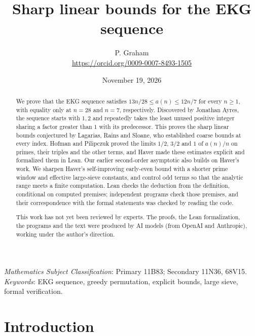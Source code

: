 \documentclass[11pt]{article}
\title{Sharp linear bounds for the EKG sequence}
\author{P. Graham\\ \small\url{https://orcid.org/0009-0007-8493-1505}}
\date{November 19, 2026}
\theoremstyle{definition}
\theoremstyle{remark}
\begin{document}
\maketitle

\begin{abstract}
We prove that the EKG sequence satisfies $13n/28\le a(n)\le12n/7$ for
every $n\ge1$, with equality only at $n=28$ and $n=7$, respectively.
Discovered by Jonathan Ayres, the sequence starts with $1,2$ and
repeatedly takes the least unused
positive integer sharing a factor greater than $1$ with its predecessor.
This proves the sharp linear bounds conjectured by Lagarias, Rains and
Sloane, who established coarse bounds at every index. Hofman and Pilipczuk
proved the limits $1/2$, $3/2$ and $1$ of $a(n)/n$ on primes, their
triples and the other terms, and Haver made these estimates explicit and
formalized them in Lean. Our earlier
second-order asymptotic also builds on Haver's work. We sharpen Haver's
self-improving early-even bound with a shorter prime window and effective
large-sieve constants, and control odd terms so that the analytic range
meets a finite computation. Lean checks the deduction from
the definition, conditional on computed premises; independent programs
check those premises, and their correspondence with the formal
statements was checked by reading the code.

This work has not yet been reviewed by experts.
The proofs, the Lean formalization, the programs and the text were
produced by AI models (from OpenAI and Anthropic), working under the
author's direction.
\end{abstract}

\bigskip
{} \emph{Mathematics Subject Classification}:
Primary 11B83; Secondary 11N36, 68V15.\\
\emph{Keywords}: EKG sequence, greedy permutation, explicit bounds,
large sieve, formal verification.




\section{Introduction}
\end{document}
